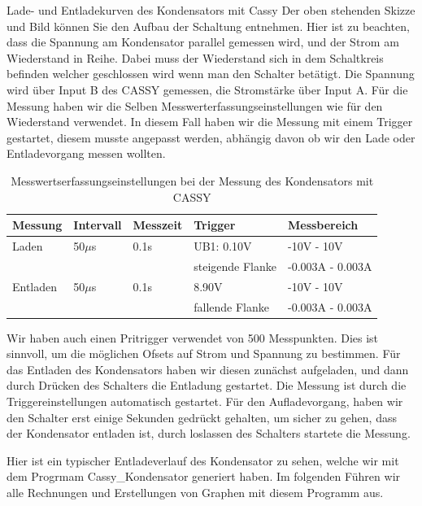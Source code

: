 \documentclass[twoside]{protokoll}
\begin{document}
\begin{aufgabe}{Lade- und Entladekurven des Kondensators mit Cassy}
 Der oben stehenden Skizze und Bild können Sie den Aufbau der Schaltung entnehmen. Hier ist zu beachten, dass die Spannung am Kondensator parallel gemessen wird, und der Strom am Wiederstand in Reihe. 
 Dabei muss der Wiederstand sich in dem Schaltkreis befinden welcher geschlossen wird wenn man den Schalter betätigt. 
 Die Spannung wird über Input B des CASSY gemessen, die Stromstärke über Input A. Für die Messung haben wir die Selben Messwerterfassungseinstellungen wie für den Wiederstand verwendet. 
 In diesem Fall haben wir die Messung mit einem Trigger gestartet, diesem musste angepasst werden, abhängig davon ob wir den Lade oder Entladevorgang messen wollten.
 
 \begin{table}[H]
        \centering
        \begin{tabularx}{1\textwidth}{X X X l l} %
            \toprule
            \textbf{Messung} & \textbf{Intervall} & \textbf{Messzeit} & \textbf{Trigger} & \textbf{Messbereich} \\
            \midrule
            Laden & 50$\mu$s  & 0.1s & UB1: 0.10V & -10V - 10V \\
            & & & steigende Flanke & -0.003A - 0.003A\\
            Entladen & 50$\mu$s  & 0.1s & 8.90V & -10V - 10V \\
            & & & fallende Flanke & -0.003A - 0.003A\\
            \bottomrule
        \end{tabularx}
        \caption{Messwertserfassungseinstellungen bei der Messung des Kondensators mit CASSY}
        \label{tab:mytable}
    \end{table}

Wir haben auch einen Pritrigger verwendet von 500 Messpunkten. Dies ist sinnvoll, um die möglichen Ofsets auf Strom und Spannung zu bestimmen.
Für das Entladen des Kondensators haben wir diesen zunächst aufgeladen, und dann durch Drücken des Schalters die Entladung gestartet. 
Die Messung ist durch die Triggereinstellungen automatisch gestartet.
Für den Aufladevorgang, haben wir den Schalter erst einige Sekunden gedrückt gehalten, um sicher zu gehen, dass der Kondensator entladen ist, durch loslassen des Schalters startete die Messung.

 
Hier ist ein typischer Entladeverlauf des Kondensator zu sehen, welche wir mit dem Progrmam Cassy\_Kondensator generiert haben.
Im folgenden Führen wir alle Rechnungen und Erstellungen von Graphen mit diesem Programm aus.\\


\end{aufgabe}
\end{document}
